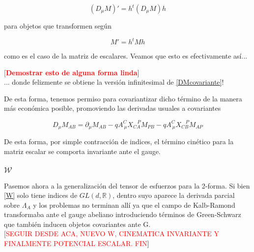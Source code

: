 \documentclass{article}
\numberwithin{equation}{section}
\begin{document}
\begin{equation}\label{DMcovariante}
\left(D_{\mu} M\right)' = h^{t} \left(D_{\mu} M\right) h 
\end{equation}

para objetos que transformen según

\begin{equation}
M' = h^{t} M h
\end{equation}

como es el caso de la matriz de escalares. Veamos que esto es efectivamente así...

[\textcolor{red}{\textbf{Demostrar esto de alguna forma linda}}]\\

... donde felizmente se obtiene la versión infinitesimal de \ref{DMcovariante}! 

De esta forma, tenemos permiso para covariantizar dicho término de la manera más económica posible, promoviendo las derivadas usuales a covariantes


\begin{boxquation}
\begin{equation}
D_{\mu} M_{A B} = \partial_{\mu}  M_{A B} -q A^C_{\ \mu} X_{C A}^{\ \ \ \ P} M_{P B} - q A^C_{\ \mu} X_{C B}^{\ \ \ \ P} M_{A P}
\end{equation}
\end{boxquation}

De esta forma, por simple contracción de indices, el término cinético para la matriz escalar se comporta invariante ante el gauge.\\

\subsubsection{ $ \bm{\mathcal{W}} $}

Pasemos ahora a la generalización del tensor de esfuerzos para la 2-forma. Si bien \ref{W} solo tiene indices de $ GL(d,\mathbb{R}) $, dentro suyo aparece la derivada parcial sobre $ \Lambda_A $ y los problemas no terminan allí ya que el campo de Kalb-Ramond transformaba ante el gauge abeliano introduciendo términos de Green-Schwarz que también inducen objetos covariantes ante G.\\

[\textcolor{red}{SEGUIR DESDE ACA, NUEVO W, CINEMATICA INVARIANTE Y FINALMENTE POTENCIAL ESCALAR. FIN}]

  
\end{document}
